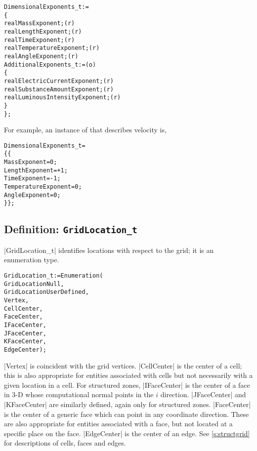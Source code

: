 \begin{alltt}
  DimensionalExponents\_t :=
    \{
    real MassExponent ;                                                     (r)
    real LengthExponent ;                                                   (r)
    real TimeExponent ;                                                     (r)
    real TemperatureExponent ;                                              (r)
    real AngleExponent ;                                                    (r)
    AdditionalExponents\_t :=                                                (o)
      \{
      real ElectricCurrentExponent   ;                                      (r)
      real SubstanceAmountExponent   ;                                      (r)
      real LuminousIntensityExponent ;                                      (r)
      \}
    \} ;
\end{alltt}

For example, an instance of  that describes 
velocity is,

\begin{alltt}
  DimensionalExponents\_t =
    \{\{
    MassExponent        =  0 ;
    LengthExponent      = +1 ;
    TimeExponent        = -1 ;
    TemperatureExponent =  0 ;
    AngleExponent       =  0 ;
    \}\} ;
\end{alltt}

\subsection{Definition: \texttt{GridLocation\_t}}
\label{s:GridLocation}

|GridLocation_t| identifies locations with respect to the grid; it is an
enumeration type.
\begin{alltt}
  GridLocation\_t := Enumeration( 
    GridLocationNull,
    GridLocationUserDefined,
    Vertex,
    CellCenter,
    FaceCenter,
    IFaceCenter,
    JFaceCenter,
    KFaceCenter,
    EdgeCenter ) ;
\end{alltt}
|Vertex| is coincident with the grid vertices.
|CellCenter| is the center of a cell; this is also appropriate for
entities associated with cells but not necessarily with a given
location in a cell.
For structured zones, |IFaceCenter| is the center of a face in 3-D
whose computational normal points in the $i$ direction.
|JFaceCenter| and |KFaceCenter| are similarly defined,
again only for structured zones.
|FaceCenter| is the center of a generic face which can point in any
coordinate direction.
These are also appropriate for entities associated with a face, but not
located at a specific place on the face.
|EdgeCenter| is the center of an edge.
See \autoref{s:structgrid} for descriptions of cells, faces and edges.

